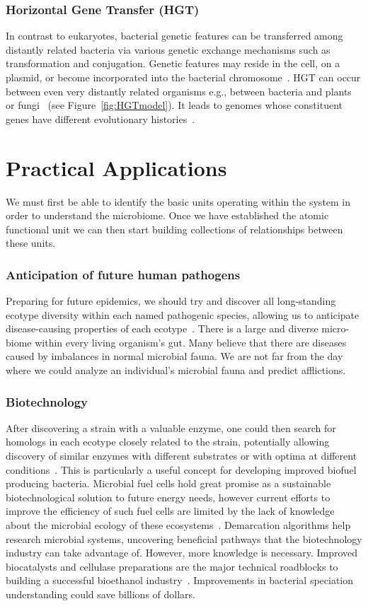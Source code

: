 \subsubsection*{Horizontal Gene Transfer (HGT)}
In contrast to eukaryotes, bacterial genetic features can be transferred among distantly related bacteria via various genetic exchange mechanisms such as transformation and conjugation.
Genetic features may reside in the cell, on a plasmid, or become incorporated into the bacterial chromosome~\cite{staley1997biodiversity}.
HGT can occur between even very distantly related organisms e.g., between bacteria and plants or fungi~\cite{gogarten2002prokaryotic} (see Figure~\ref{fig:HGTmodel}).
It leads to genomes whose constituent genes have different evolutionary histories~\cite{gogarten2002prokaryotic}.

\section{Practical Applications}
We must first be able to identify the basic units operating within the system in order to understand the microbiome.
Once we have established the atomic functional unit we can then start building collections of relationships between these units. 

\subsubsection*{Anticipation of future human pathogens}
Preparing for future epidemics, we should try and discover all long-standing ecotype diversity within each named pathogenic species, allowing us to anticipate disease-causing properties of each ecotype~\cite{cohan2007systematics}.
There is a large and diverse micro-biome within every living organism's gut.
Many believe that there are diseases caused by imbalances in normal microbial fauna.
We are not far from the day where we could analyze an individual's microbial fauna and predict afflictions.

\subsubsection*{Biotechnology}
After discovering a strain with a valuable enzyme, one could then search for homologs in each ecotype closely related to the strain, potentially allowing discovery of similar enzymes with different substrates or with optima at different conditions~\cite{cohan2007systematics}.
This is particularly a useful concept for developing improved biofuel producing bacteria.
Microbial fuel cells hold great promise as a sustainable biotechnological solution to future energy needs, however current efforts to improve the efficiency of such fuel cells are limited by the lack of knowledge about the microbial ecology of these ecosystems~\cite{rabaey2004biofuel}.
Demarcation algorithms help research microbial systems, uncovering beneficial pathways that the biotechnology industry can take advantage of.
However, more knowledge is necessary.
Improved biocatalysts and cellulase preparations are the major technical roadblocks to building a successful bioethanol industry~\cite{dien2003bacteria}.
Improvements in bacterial speciation understanding could save billions of dollars.

